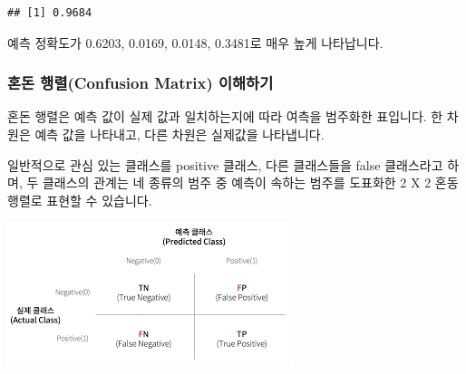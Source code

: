 \documentclass[12pt,]{book}
\newenvironment{Shaded}{\begin{snugshade}}{\end{snugshade}}
\newcommand{\DecValTok}[1]{\textcolor[rgb]{0.00,0.00,0.81}{#1}}
\newcommand{\FloatTok}[1]{\textcolor[rgb]{0.00,0.00,0.81}{#1}}
\newcommand{\KeywordTok}[1]{\textcolor[rgb]{0.13,0.29,0.53}{\textbf{#1}}}
\newcommand{\NormalTok}[1]{#1}
\newcommand{\OperatorTok}[1]{\textcolor[rgb]{0.81,0.36,0.00}{\textbf{#1}}}
\newcommand{\StringTok}[1]{\textcolor[rgb]{0.31,0.60,0.02}{#1}}
\begin{document}
\begin{Shaded}
\end{Shaded}

\begin{verbatim}
## [1] 0.9684
\end{verbatim}

예측 정확도가 0.6203, 0.0169, 0.0148, 0.3481로 매우 높게 나타납니다.

\hypertarget{uxd63cuxb3c8-uxd589uxb82cconfusion-matrix-uxc774uxd574uxd558uxae30}{%
\subsubsection{혼돈 행렬(Confusion Matrix) 이해하기}\label{uxd63cuxb3c8-uxd589uxb82cconfusion-matrix-uxc774uxd574uxd558uxae30}}

혼돈 행렬은 예측 값이 실제 값과 일치하는지에 따라 여측을 범주화한 표입니다. 한 차원은 예측 값을 나타내고, 다른 차원은 실제값을 나타냅니다.

일반적으로 관심 있는 클래스를 positive 클래스, 다른 클래스들을 false 클래스라고 하며, 두 클래스의 관계는 네 종류의 범주 중 예측이 속하는 범주를 도표화한 2 X 2 혼동 행렬로 표현할 수 있습니다.

\begin{center}\includegraphics[width=0.5\linewidth]{images/confusion_matrix} \end{center}
\end{document}

